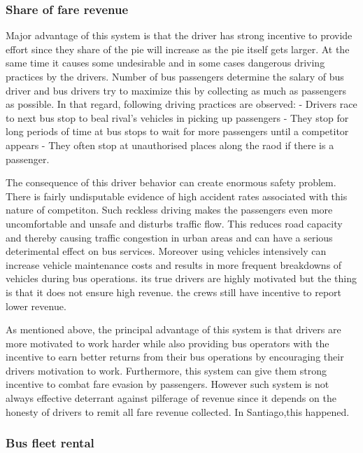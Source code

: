 \documentclass[11pt,]{article}
\begin{document}
\subsubsection{Share of fare revenue}\label{share-of-fare-revenue}

Major advantage of this system is that the driver has strong incentive
to provide effort since they share of the pie will increase as the pie
itself gets larger. At the same time it causes some undesirable and in
some cases dangerous driving practices by the drivers. Number of bus
passengers determine the salary of bus driver and bus drivers try to
maximize this by collecting as much as passengers as possible. In that
regard, following driving practices are observed: - Drivers race to next
bus stop to beal rival's vehicles in picking up passengers - They stop
for long periods of time at bus stops to wait for more passengers until
a competitor appears - They often stop at unauthorised places along the
raod if there is a passenger.

The consequence of this driver behavior can create enormous safety
problem. There is fairly undisputable evidence of high accident rates
associated with this nature of competiton. Such reckless driving makes
the passengers even more uncomfortable and unsafe and disturbs traffic
flow. This reduces road capacity and thereby causing traffic congestion
in urban areas and can have a serious deterimental effect on bus
services. Moreover using vehicles intensively can increase vehicle
maintenance costs and results in more frequent breakdowns of vehicles
during bus operations. its true drivers are highly motivated but the
thing is that it does not ensure high revenue. the crews still have
incentive to report lower revenue.

As mentioned above, the principal advantage of this system is that
drivers are more motivated to work harder while also providing bus
operators with the incentive to earn better returns from their bus
operations by encouraging their drivers motivation to work. Furthermore,
this system can give them strong incentive to combat fare evasion by
passengers. However such system is not always effective deterrant
against pilferage of revenue since it depends on the honesty of drivers
to remit all fare revenue collected. In Santiago,this happened.

\subsubsection{Bus fleet rental}\label{bus-fleet-rental}
\end{document}
